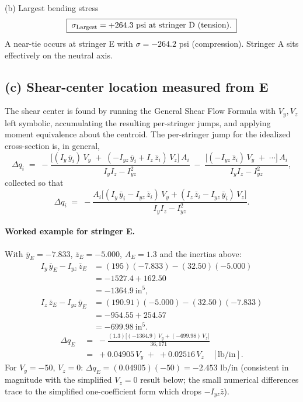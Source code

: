 \documentclass[11pt]{article}
\begin{document}
\begin{answerbox}{(b) Largest bending stress}
\[
\boxed{\;\sigma_{\rm Largest} = +264.3\ \text{psi at stringer D (tension).}\;}
\]
A near-tie occurs at stringer E with $\sigma = -264.2$ psi (compression). Stringer A sits effectively on the neutral axis.
\end{answerbox}

\subsection*{(c) Shear-center location measured from E}

The shear center is found by running the General Shear Flow Formula with $V_y, V_z$ left symbolic, accumulating the resulting per-stringer jumps, and applying moment equivalence about the centroid. The per-stringer jump for the idealized cross-section is, in general,
\[
\Delta q_i \;=\; -\frac{\bigl[(I_y\,\bar y_i)\,V_y \;+\; (-I_{yz}\,\bar y_i + I_z\,\bar z_i)\,V_z\bigr]\,A_i}{I_y I_z - I_{yz}^2}
\;-\; \frac{\bigl[(-I_{yz}\,\bar z_i)\,V_y \;+\; \cdots \bigr]\,A_i}{I_y I_z - I_{yz}^2},
\]
collected so that
\[
\Delta q_i \;=\; -\frac{A_i\bigl[(I_y\,\bar y_i - I_{yz}\,\bar z_i)\,V_y + (I_z\,\bar z_i - I_{yz}\,\bar y_i)\,V_z\bigr]}{I_y I_z - I_{yz}^2}.
\]

\paragraph{Worked example for stringer E.} With $\bar y_E = -7.833$, $\bar z_E = -5.000$, $A_E = 1.3$ and the inertias above:
\begin{align*}
I_y\,\bar y_E - I_{yz}\,\bar z_E &= (195)(-7.833) - (32.50)(-5.000)\\
                                &= -1527.4 + 162.50\\
                                &= -1364.9\ \text{in}^5,\\[2pt]
I_z\,\bar z_E - I_{yz}\,\bar y_E &= (190.91)(-5.000) - (32.50)(-7.833)\\
                                &= -954.55 + 254.57\\
                                &= -699.98\ \text{in}^5.
\end{align*}
\begin{align*}
\Delta q_E &\;=\; -\frac{(1.3)\bigl[(-1364.9)\,V_y + (-699.98)\,V_z\bigr]}{36{,}171}\\
           &\;=\; +0.04905\,V_y \;+\; +0.02516\,V_z\quad[\text{lb/in}].
\end{align*}
For $V_y = -50$, $V_z = 0$: $\Delta q_E = (0.04905)(-50) = -2.453$ lb/in (consistent in magnitude with the simplified $V_z = 0$ result below; the small numerical differences trace to the simplified one-coefficient form which drops $-I_{yz}\bar z$).
\end{document}
